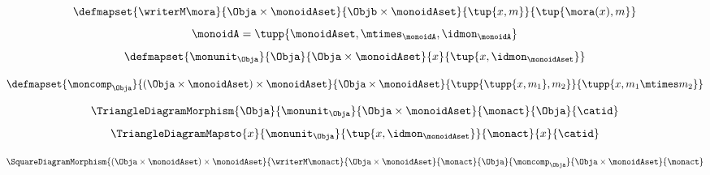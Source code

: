 \begin{equation}\label{eq:writer-2}
    \defmapset{
        \writerM \mora
    }{
        \Obja \times \monoidAset
    }{
        \Objb \times \monoidAset
    }{
        \tup{x, m}
    }{
        \tup{\mora(x), m}
    }
\end{equation}
\begin{equation}\label{eq:writer-monoid}
    \monoidA = \tupp{\monoidAset, \mtimes_{\monoidA}, \idmon_{\monoidA}}
\end{equation}
\begin{equation}\label{eq:writer-comp}
    \defmapset{
        \monunit_\Obja
    }{
        \Obja
    }{
        \Obja \times \monoidAset
    }{
        x
    }{
        \tup{x, \idmon_{\monoidAset}}
    }
\end{equation}

\begin{equation}\label{eq:writer-comp2}
    \defmapset{
        \moncomp_\Obja
    }{
        (\Obja \times \monoidAset) \times \monoidAset
    }{
        \Obja \times \monoidAset
    }{
        \tupp{\tupp{x,m_1 }, m_2}
    }{
        \tupp{x, m_1 \mtimes m_2}
    }
\end{equation}



\begin{equation}\label{eq:writer-algebra-condition-triangle-domain}
    \TriangleDiagramMorphism{\Obja}{\monunit_\Obja}{\Obja\times\monoidAset}{\monact}{\Obja}{\catid}
\end{equation}
\begin{equation}\label{eq:writer-algebra-condition-triangle}
    \TriangleDiagramMapsto{x}{\monunit_\Obja}{\tup{x, \idmon_{\monoidAset}}}{\monact}{x}{\catid}
\end{equation}

\begin{equation}\label{eq:writer-algebra-condition-square-domain}
    \SquareDiagramMorphism{
        (\Obja \times \monoidAset) \times \monoidAset
    }{
        \writerM \monact
    }{
        \Obja \times \monoidAset
    }{
        \monact
    }{
        \Obja
    }{
        \moncomp_\Obja
    }{
        \Obja \times \monoidAset
    }{
        \monact
    }
\end{equation}

